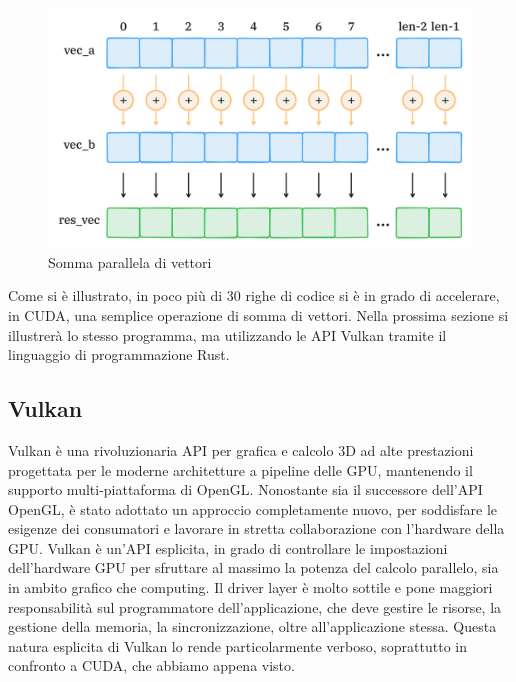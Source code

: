 \begin{figure}[ht]
    \centering
    \includegraphics[width=.9\linewidth]{images/chapter2/sum_vec.png}
    \caption{Somma parallela di vettori}
    \label{fig:sum_vec}
\end{figure}


Come si è illustrato, in poco più di 30 righe di codice si è in grado di accelerare, in CUDA, una semplice operazione di somma di vettori. Nella prossima sezione si illustrerà lo stesso programma, ma utilizzando le API Vulkan tramite il linguaggio di programmazione Rust.

\subsection[Vulkan]{Vulkan}

Vulkan è una rivoluzionaria API per grafica e calcolo 3D ad alte prestazioni progettata per le moderne architetture a pipeline delle GPU, mantenendo il supporto multi-piattaforma di OpenGL. Nonostante sia il successore dell'API OpenGL, è stato adottato un approccio completamente nuovo, per soddisfare le esigenze dei consumatori e lavorare in stretta collaborazione con l'hardware della GPU. Vulkan è un'API esplicita, in grado di controllare le impostazioni dell'hardware GPU per sfruttare al massimo la potenza del calcolo parallelo, sia in ambito grafico che computing. Il driver layer è molto sottile e pone maggiori responsabilità sul programmatore dell'applicazione, che deve gestire le risorse, la gestione della memoria, la sincronizzazione, oltre all'applicazione stessa. Questa natura esplicita di Vulkan lo rende particolarmente verboso, soprattutto in confronto a CUDA, che abbiamo appena visto.

